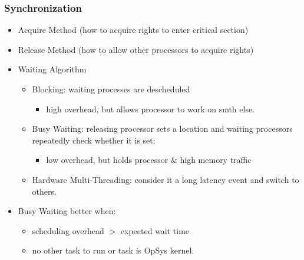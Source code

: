 \documentclass{beamer}
\renewcommand{\emph}[1]{\textcolor{structure}{#1}}
\newcommand{\emp}[1]{\textcolor{DikuRed}{ #1}}
\begin{document}
\begin{frame}[fragile,t]
\frametitle{Synchronization}

\begin{itemize}
    \item \emp{Acquire Method} (how to acquire rights to enter critical section)\medskip
    \item \emp{Release Method} (how to allow other processors to acquire rights)\medskip
    \item \emp{Waiting Algorithm}\smallskip
        \begin{itemize}
            \item \emp{Blocking}: waiting processes are descheduled
                \begin{itemize}
                    \item \alert{high overhead,} \emph{but allows processor to work on smth else.}
                \end  {itemize}\smallskip
            \item \emp{Busy Waiting}: releasing processor sets a location 
                        and waiting processors repeatedly check whether it is set:
                \begin{itemize}
                    \item \emph{low overhead}, \alert{but holds processor \& high memory traffic}
                \end  {itemize}\smallskip
            \item \emp{Hardware Multi-Threading}: consider it a long latency event and switch to others.
        \end  {itemize}\medskip
    \item \emph{Busy Waiting better when:}
        \begin{itemize}
            \item scheduling overhead $>$ expected wait time
            \item no other task to run or task is OpSys kernel.
        \end  {itemize}
\end{itemize}

\end{frame}
\end{document}
